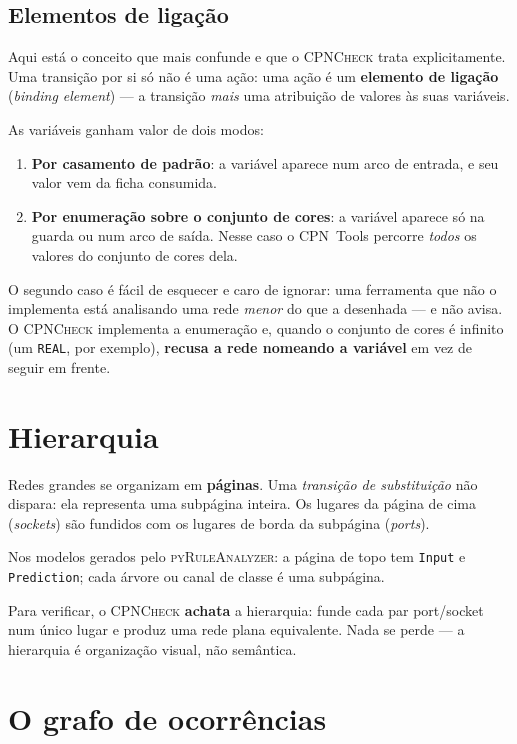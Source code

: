 \documentclass[11pt,a4paper]{report}
\newcommand{\cpn}{\textsc{CPNCheck}}
\newcommand{\pyra}{\textsc{pyRuleAnalyzer}}
\newcommand{\cpntools}{CPN~Tools}
\newcommand{\code}[1]{\texttt{\small #1}}
\begin{document}
\subsection*{Elementos de ligação}

Aqui está o conceito que mais confunde e que o \cpn{} trata explicitamente.
Uma transição por si só não é uma ação: uma ação é um \textbf{elemento de
ligação} (\emph{binding element}) --- a transição \emph{mais} uma atribuição
de valores às suas variáveis.

As variáveis ganham valor de dois modos:

\begin{enumerate}
  \item \textbf{Por casamento de padrão}: a variável aparece num arco de
        entrada, e seu valor vem da ficha consumida.
  \item \textbf{Por enumeração sobre o conjunto de cores}: a variável aparece
        só na guarda ou num arco de saída. Nesse caso o \cpntools{} percorre
        \emph{todos} os valores do conjunto de cores dela.
\end{enumerate}

O segundo caso é fácil de esquecer e caro de ignorar: uma ferramenta que não
o implementa está analisando uma rede \emph{menor} do que a desenhada --- e
não avisa. O \cpn{} implementa a enumeração e, quando o conjunto de cores é
infinito (um \code{REAL}, por exemplo), \textbf{recusa a rede nomeando a
variável} em vez de seguir em frente.

\section{Hierarquia}

Redes grandes se organizam em \textbf{páginas}. Uma \emph{transição de
substituição} não dispara: ela representa uma subpágina inteira. Os lugares da
página de cima (\emph{sockets}) são fundidos com os lugares de borda da
subpágina (\emph{ports}).

Nos modelos gerados pelo \pyra{}: a página de topo tem \code{Input} e
\code{Prediction}; cada árvore ou canal de classe é uma subpágina.

Para verificar, o \cpn{} \textbf{achata} a hierarquia: funde cada par
port/socket num único lugar e produz uma rede plana equivalente. Nada se perde
--- a hierarquia é organização visual, não semântica.

\section{O grafo de ocorrências}
\end{document}
